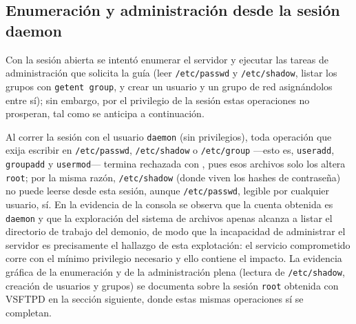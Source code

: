 \subsection{Enumeración y administración desde la sesión daemon}

Con la sesión abierta se intentó enumerar el servidor y ejecutar las tareas de administración que solicita la guía (leer \texttt{/etc/passwd} y \texttt{/etc/shadow}, listar los grupos con \texttt{getent group}, y crear un usuario y un grupo de red asignándolos entre sí); sin embargo, por el privilegio de la sesión estas operaciones no prosperan, tal como se anticipa a continuación.

\begin{analisis}
Al correr la sesión con el usuario \texttt{daemon} (sin privilegios), toda operación que exija escribir en \texttt{/etc/passwd}, \texttt{/etc/shadow} o \texttt{/etc/group} —esto es, \texttt{useradd}, \texttt{groupadd} y \texttt{usermod}— termina rechazada con , pues esos archivos solo los altera \texttt{root}; por la misma razón, \texttt{/etc/shadow} (donde viven los hashes de contraseña) no puede leerse desde esta sesión, aunque \texttt{/etc/passwd}, legible por cualquier usuario, sí. En la evidencia de la consola se observa que la cuenta obtenida es \texttt{daemon} y que la exploración del sistema de archivos apenas alcanza a listar el directorio de trabajo del demonio, de modo que la incapacidad de administrar el servidor es precisamente el hallazgo de esta explotación: el servicio comprometido corre con el mínimo privilegio necesario y ello contiene el impacto. La evidencia gráfica de la enumeración y de la administración plena (lectura de \texttt{/etc/shadow}, creación de usuarios y grupos) se documenta sobre la sesión \texttt{root} obtenida con VSFTPD en la sección siguiente, donde estas mismas operaciones sí se completan.
\end{analisis}

